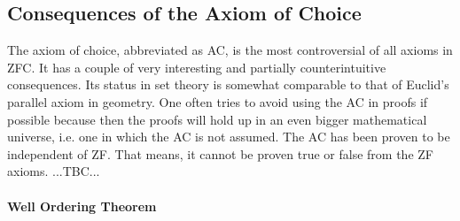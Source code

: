 










\subsection{Consequences of the Axiom of Choice}
The axiom of choice, abbreviated as AC, is the most controversial of all axioms in ZFC. It has a couple of very interesting and partially counterintuitive consequences. Its status in set theory is somewhat comparable to that of Euclid's parallel axiom in geometry. One often tries to avoid using the AC in proofs if possible because then the proofs will hold up in an even bigger mathematical universe, i.e. one in which the AC is not assumed. The AC has been proven to be independent of ZF. That means, it cannot be proven true or false from the ZF axioms. ...TBC...


\paragraph{Well Ordering Theorem}



